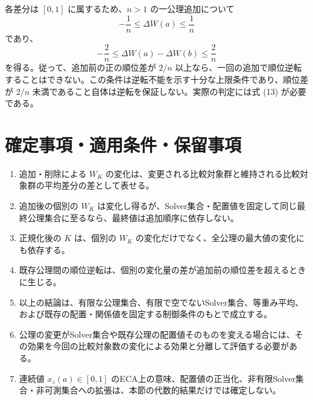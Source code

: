 \documentclass[a4paper,11pt]{ltjsarticle}
\begin{document}
各差分は $[0,1]$ に属するため、$n>1$ の一公理追加について
\[
-\frac1n\le\Delta W(a)\le\frac1n
\]
であり、
\[
-\frac2n\le\Delta W(a)-\Delta W(b)\le\frac2n
\]
を得る。従って、追加前の正の順位差が $2/n$ 以上なら、一回の追加で順位逆転することはできない。この条件は逆転不能を示す十分な上限条件であり、順位差が $2/n$ 未満であること自体は逆転を保証しない。実際の判定には式 (13) が必要である。

\section{確定事項・適用条件・保留事項}
\begin{enumerate}
\item 追加・削除による $W_K$ の変化は、変更される比較対象群と維持される比較対象群の平均差分の差として表せる。
\item 追加後の個別の $W_K$ は変化し得るが、Solver集合・配置値を固定して同じ最終公理集合に至るなら、最終値は追加順序に依存しない。
\item 正規化後の $K$ は、個別の $W_K$ の変化だけでなく、全公理の最大値の変化にも依存する。
\item 既存公理間の順位逆転は、個別の変化量の差が追加前の順位差を超えるときに生じる。
\item 以上の結論は、有限な公理集合、有限で空でないSolver集合、等重み平均、および既存の配置・関係値を固定する制御条件のもとで成立する。
\item 公理の変更がSolver集合や既存公理の配置値そのものを変える場合には、その効果を今回の比較対象数の変化による効果と分離して評価する必要がある。
\item 連続値 $x_z(a)\in[0,1]$ のECA上の意味、配置値の正当化、非有限Solver集合・非可測集合への拡張は、本節の代数的結果だけでは確定しない。
\end{enumerate}
\end{document}
